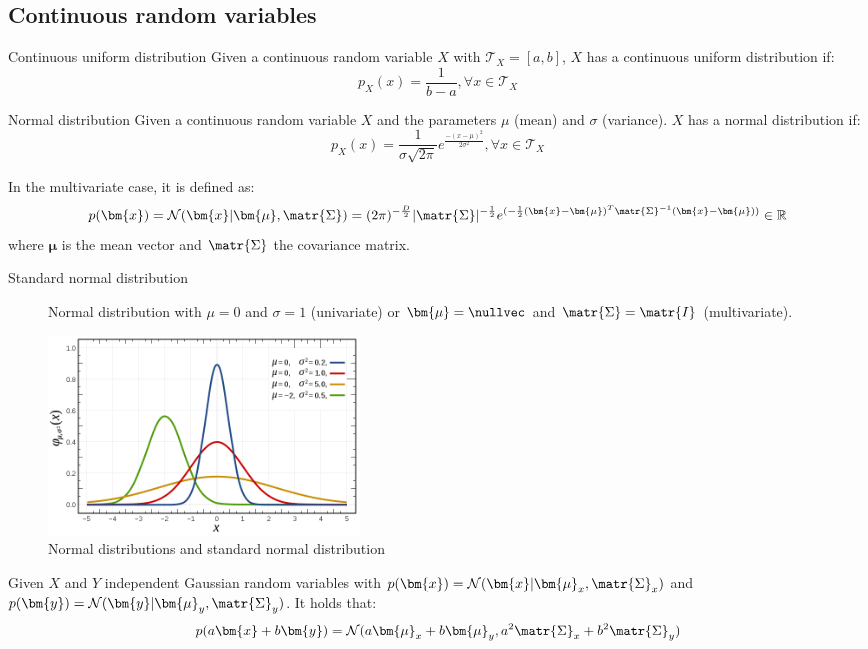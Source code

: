 \subsection{Continuous random variables}
\begin{descriptionlist}
    \item[Continuous uniform distribution] 
        Given a continuous random variable $X$ with $\mathcal{T}_X = [a, b]$,
        $X$ has a continuous uniform distribution if:
        \[ p_X(x) = \frac{1}{b-a}, \forall x \in \mathcal{T}_X \]
    
    \item[Normal distribution] 
        Given a continuous random variable $X$ and the parameters $\mu$ (mean) and $\sigma$ (variance).
        $X$ has a normal distribution if:
        \[ p_X(x) = \frac{1}{\sigma \sqrt{2\pi}} e^{\frac{-(x-\mu)^2}{2\sigma^2}} , \forall x \in \mathcal{T}_X\]

        In the multivariate case, it is defined as:
        \[ 
            p(\bm{x}) = \mathcal{N}(\bm{x} \vert \bm{\mu}, \matr{\Sigma}) = 
                (2\pi)^{-\frac{D}{2}} \vert \matr{\Sigma} \vert^{-\frac{1}{2}} e^{(-\frac{1}{2}(\bm{x} - \bm{\mu})^T\matr{\Sigma}^{-1}(\bm{x}-\bm{\mu}))}
                \in \mathbb{R}
        \]
        where $\bm{\mu}$ is the mean vector and  $\matr{\Sigma}$ the covariance matrix.

        \begin{description}
            \item[Standard normal distribution] 
                Normal distribution with $\mu = 0$ and $\sigma = 1$ (univariate) or 
                $\bm{\mu} = \nullvec$ and $\matr{\Sigma} = \matr{I}$ (multivariate).
        \end{description}

        \begin{figure}[ht]
            \centering
            \includegraphics[width=0.40\textwidth]{img/normal_distribution.png}
            \caption{Normal distributions and standard normal distribution}
        \end{figure}


        \begin{theorem}[Linearity]
            Given $X$ and $Y$ independent Gaussian random variables with
            $p(\bm{x}) = \mathcal{N}(\bm{x} \vert \bm{\mu}_x, \matr{\Sigma}_x)$ and
            $p(\bm{y}) = \mathcal{N}(\bm{y} \vert \bm{\mu}_y, \matr{\Sigma}_y)$.
            It holds that:
            \[ p(a\bm{x} + b\bm{y}) = \mathcal{N}(a\bm{\mu}_x + b\bm{\mu}_y, a^2\matr{\Sigma}_x + b^2\matr{\Sigma}_y) \]
        \end{theorem}
\end{descriptionlist}